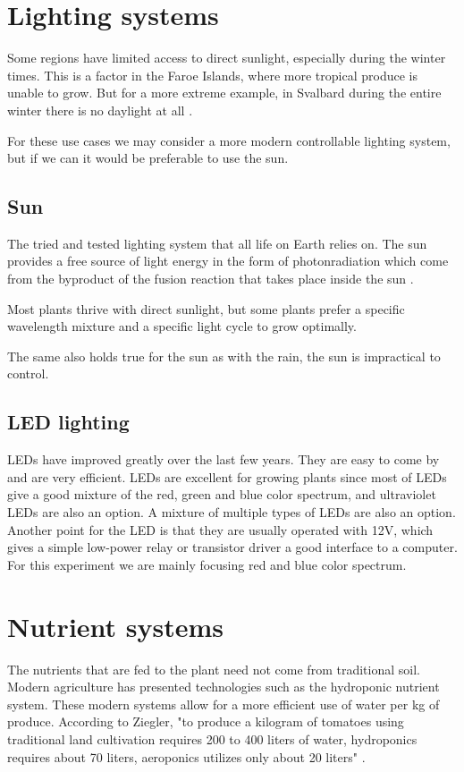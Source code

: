 \documentclass[a4paper,12pt,twoside,openright,titlepage]{book}
\begin{document}
\section{Lighting systems}
Some regions have limited access to direct sunlight, especially during the winter times.
This is a factor in the Faroe Islands, where more tropical produce is unable to grow.
But for a more extreme example, in Svalbard during the entire winter there is no daylight at all \cite{svalbard}.

For these use cases we may consider a more modern controllable lighting system, but if we can it would be preferable to use the sun.

\subsection{Sun}
The tried and tested lighting system that all life on Earth relies on.
The sun provides a free source of light energy in the form of photonradiation which come from the byproduct of the fusion reaction that takes place inside the sun \cite{abhyankar}.

Most plants thrive with direct sunlight, but some plants prefer a specific wavelength mixture and a specific light cycle to grow optimally.

The same also holds true for the sun as with the rain, the sun is impractical to control.

\subsection{LED lighting}
LEDs have improved greatly over the last few years. They are easy to come by and are very efficient.
LEDs are excellent for growing plants since most of LEDs give a good mixture of the red, green and blue color spectrum, and ultraviolet LEDs are also an option.
A mixture of multiple types of LEDs are also an option.
Another point for the LED is that they are usually operated with 12V, which gives a simple low-power relay or transistor driver a good interface to a computer.
For this experiment we are mainly focusing red and blue color spectrum.

\section{Nutrient systems}
The nutrients that are fed to the plant need not come from traditional soil.
Modern agriculture has presented technologies such as the hydroponic nutrient system.
These modern systems allow for a more efficient use of water per kg of produce.
According to Ziegler, "to produce a kilogram of tomatoes using traditional land
cultivation requires 200 to 400 liters of water, hydroponics requires about 70 liters,
aeroponics utilizes only about 20 liters" \cite{aeroponic}.
\end{document}
